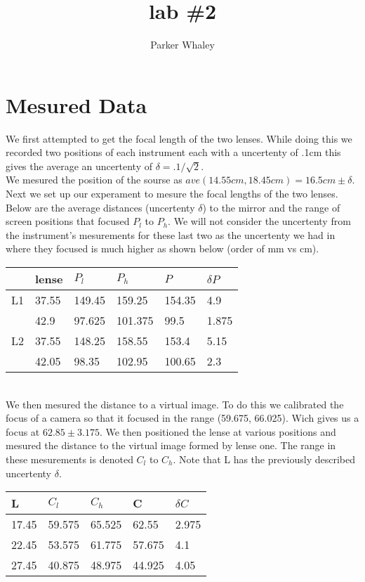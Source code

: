 \documentclass[12pt,a4paper]{article}
\author{Parker Whaley}
\title{lab \#2}
\begin{document}
\maketitle
\section{Mesured Data}
We first attempted to get the focal length of the two lenses.  While doing this we recorded two positions of each instrument each with a uncertenty of .1cm this gives the average an uncertenty of $\delta=.1/\sqrt{2}$.\\

We mesured the position of the sourse as $ave(14.55cm, 18.45cm)=16.5cm \pm \delta$.\\

Next we set up our experament to mesure the focal lengths of the two lenses.  Below are the average distances (uncertenty $\delta$) to the mirror and the range of screen positions that focused $P_l$ to $P_h$.  We will not consider the uncertenty from the instrument's mesurements for these last two as the uncertenty we had in where they focused is much higher as shown below (order of mm vs cm).\\

\begin{tabular}{| l | l | l | l | l | l |}
\hline
 & lense & $P_l$ & $P_h$ & $P$ & $\delta P$\\
\hline
L1 & 37.55 & 149.45 & 159.25 & 154.35 & 4.9\\
\hline
 & 42.9 & 97.625 & 101.375 & 99.5 & 1.875\\
\hline
L2 & 37.55 & 148.25 & 158.55 & 153.4 & 5.15\\
\hline
& 42.05 & 98.35 & 102.95 & 100.65 & 2.3\\
\hline
\end{tabular}\\

We then mesured the distance to a virtual image.  To do this we calibrated the focus of a camera so that it focused in the range (59.675, 66.025).  Wich gives us a focus at $62.85\pm3.175$.  We then positioned the lense at various positions and mesured the distance to the virtual image formed by lense one.  The range in these mesurements is denoted $C_l$ to $C_h$.  Note that L has the previously described uncertenty $\delta$.\\

\begin{tabular}{| l | l | l | l | l |}
\hline
L & $C_l$ & $C_h$ & C & $\delta C$\\
\hline
17.45 & 59.575 & 65.525 & 62.55 & 2.975\\
\hline
22.45 & 53.575 & 61.775 & 57.675 & 4.1\\
\hline
27.45 & 40.875 & 48.975 & 44.925 & 4.05\\
\hline
\end{tabular}\\
\end{document}

